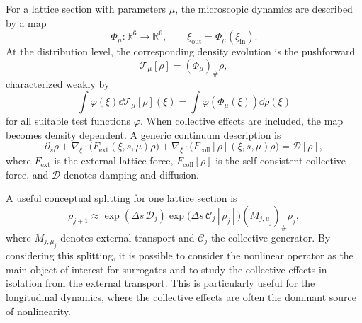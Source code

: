 For a lattice section with parameters $\mu$, the microscopic dynamics are described by a map
\begin{equation}
    \Phi_\mu:\mathbb{R}^{6}\rightarrow\mathbb{R}^{6},\qquad \xi_{\mathrm{out}}=\Phi_\mu(\xi_{\mathrm{in}}).
    \label{eq:microscopic_map_revised}
\end{equation}
At the distribution level, the corresponding density evolution is the pushforward
\begin{equation}
    \mathcal{T}_{\mu}[\rho]=(\Phi_\mu)_\#\rho,
    \label{eq:pushforward_revised}
\end{equation}
characterized weakly by
\begin{equation}
    \int \varphi(\xi)\dd\mathcal{T}_{\mu}[\rho](\xi)=\int \varphi(\Phi_\mu(\xi))\dd\rho(\xi)
\end{equation}
for all suitable test functions $\varphi$. When collective effects are included, the map becomes density dependent. A generic continuum description is
\begin{equation}
    \partial_s\rho+\nabla_\xi\cdot\big(F_{\mathrm{ext}}(\xi,s,\mu)\rho\big)+\nabla_\xi\cdot\big(F_{\mathrm{coll}}[\rho](\xi,s,\mu)\rho\big)=\mathcal{D}[\rho],
    \label{eq:generic_vfp_6d_revised}
\end{equation}
where $F_{\mathrm{ext}}$ is the external lattice force, $F_{\mathrm{coll}}[\rho]$ is the self-consistent collective force, and $\mathcal{D}$ denotes damping and diffusion.

A useful conceptual splitting for one lattice section is
\begin{equation}
    \rho_{j+1}\approx \exp(\Delta s\,\mathcal{D}_j)\exp\big(\Delta s\,\mathcal{C}_j[\rho_j]\big)(M_{j,\mu_j})_\#\rho_j,
    \label{eq:section_splitting_revised}
\end{equation}
where $M_{j,\mu_j}$ denotes external transport and $\mathcal{C}_j$ the collective generator. By considering this splitting, it is possible to consider the nonlinear operator as the main object of interest for surrogates and to study the collective effects in isolation from the external transport. This is particularly useful for the longitudinal dynamics, where the collective effects are often the dominant source of nonlinearity.
